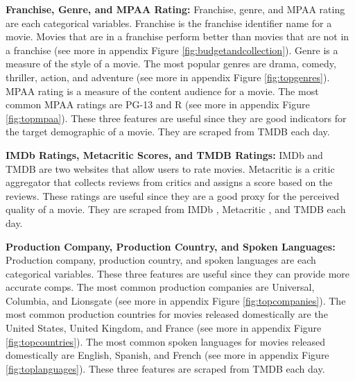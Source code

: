\documentclass[12pt]{article}
\begin{document}
\textbf{Franchise, Genre, and MPAA Rating:} Franchise, genre, and MPAA rating are each categorical variables. Franchise is the franchise identifier name for a movie. Movies that are in a franchise perform better than movies that are not in a franchise (see more in appendix Figure \ref{fig:budgetandcollection}). Genre is a measure of the style of a movie. The most popular genres are drama, comedy, thriller, action, and adventure (see more in appendix Figure \ref{fig:topgenres}). MPAA rating is a measure of the content audience for a movie. The most common MPAA ratings are PG-13 and R (see more in appendix Figure \ref{fig:topmpaa}). These three features are useful since they are good indicators for the target demographic of a movie. They are scraped from TMDB \citep{tmdbHome} each day.

\textbf{IMDb Ratings, Metacritic Scores, and TMDB Ratings:} IMDb and TMDB are two websites that allow users to rate movies. Metacritic is a critic aggregator that collects reviews from critics and assigns a score based on the reviews. These ratings are useful since they are a good proxy for the perceived quality of a movie. They are scraped from IMDb \citep{imdbHome}, Metacritic \citep{metacriticHome}, and TMDB \citep{tmdbHome} each day.

\textbf{Production Company, Production Country, and Spoken Languages:} Production company, production country, and spoken languages are each categorical variables. These three features are useful since they can provide more accurate comps. The most common production companies are Universal, Columbia, and Lionsgate (see more in appendix Figure \ref{fig:topcompanies}). The most common production countries for movies released domestically are the United States, United Kingdom, and France (see more in appendix Figure \ref{fig:topcountries}). The most common spoken languages for movies released domestically are English, Spanish, and French (see more in appendix Figure \ref{fig:toplanguages}). These three features are scraped from TMDB \citep{tmdbHome} each day.
\end{document}
